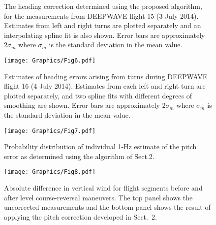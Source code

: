 \documentclass[english,british,amtd,bookmarks=false,unicode=true]{copernicus}\usepackage[]{graphicx}\usepackage[]{color}
\begin{document}
\begin{center}
\begin{figure}
\caption{The heading correction determined using the proposed algorithm, for the measurements from DEEPWAVE flight 15 (3 July 2014). Estimates from left and right turns are plotted separately and an interpolating spline fit is also shown. Error bars are approximately $2\sigma_m$ where $\sigma_m$ is the standard deviation in the mean value.\label{fig:plot-heading-correction-rf15}%
}
\end{figure}
\begin{figure}
\begin{centering}
\texttt{[image: Graphics/Fig6.pdf]}
\par\end{centering}

\caption{Estimates of heading errors arising from turns during DEEPWAVE flight 16 (4 July 2014). Estimates from each left and right turn are plotted separately, and two spline fits with different degrees of smoothing are shown. Error bars are approximately $2\sigma_m$ where $\sigma_m$ is the standard deviation in the mean value.\label{fig:spline-plot}%
}
\end{figure}
\begin{figure}
\begin{centering}
\texttt{[image: Graphics/Fig7.pdf]}
\par\end{centering}

\caption{Probability distribution of individual 1-Hz estimate of the pitch error as determined using the algorithm of Sect.2.\label{fig:typical-errors}%
}
\end{figure}
\begin{figure}
\begin{centering}
\texttt{[image: Graphics/Fig8.pdf]}
\par\end{centering}

\caption{Absolute difference in vertical wind for flight segments before and after level course-reversal maneuvers. The top panel shows the uncorrected measurements and the bottom panel shows the result of applying the pitch correction developed in Sect.\ 2.\label{fig:reverse-course-w-comparison}%
}
\end{figure}

\par\end{center}
\end{document}
